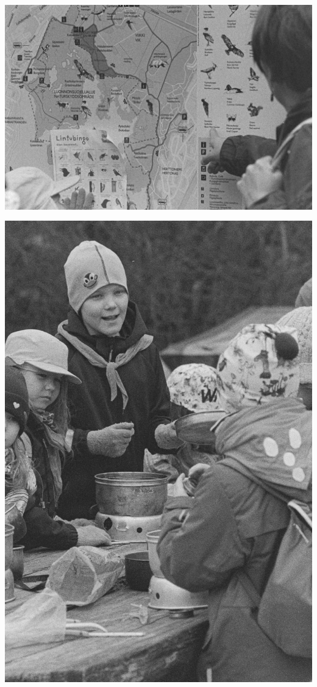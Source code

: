 \documentclass[10pt,finnish,a5paper,headings=small,twoside=semi]{scrartcl}
\begin{document}
\begin{multicols}{2}
	\vspace*{0.16cm}
	\noindent\includegraphics[width=\linewidth]{assets/kolkkienpäiväretkibw1}

	\columnbreak

	\vspace*{-0.64cm}
	\noindent\includegraphics[width=\linewidth]{assets/kolkkienpäiväretkibw2}


\end{multicols}
\end{document}
